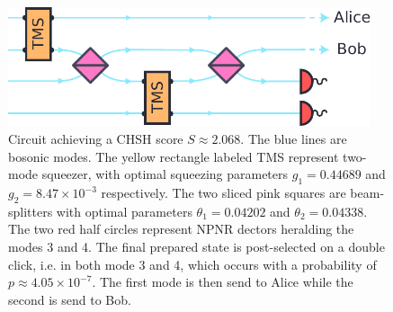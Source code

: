 \begin{figure}[ht]
	\begin{center}
		\includegraphics[width=0.95\textwidth]{chapters/deviceindependent/img/homodyne.pdf}
	\end{center}
	\caption{Circuit achieving a CHSH score $S\approx 2.068$. The blue lines are bosonic modes. The yellow rectangle labeled TMS represent two-mode squeezer, with optimal squeezing parameters $g_1=0.44689$ and $g_2=8.47\times 10^{-3}$ respectively. The two sliced pink squares are beam-splitters with optimal parameters $\theta_1 = 0.04202$ and $\theta_2 = 0.04338$. The two red half circles represent NPNR dectors heralding the modes 3 and 4. The final prepared state is post-selected on a double click, i.e. in
	both mode 3 and 4, which occurs with a probability of $p\approx 4.05\times10^{-7}$. The first mode is then send to Alice while the second is send to Bob.}
	\label{fig:homodyne}
\end{figure}


